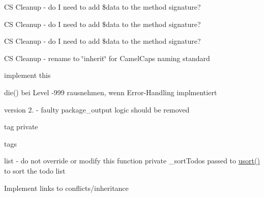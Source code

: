 
\begin{DoxyRefList}
\item[\label{todo__todo000087}%
\hypertarget{todo__todo000087}{}%
\-Global \hyperlink{_errors_8inc_a3a280f3829918777acb4ade45dc30f0c}{add\-Error} (\$num)]\-C\-S \-Cleanup -\/ do \-I need to add \$data to the method signature?  
\item[\label{todo__todo000088}%
\hypertarget{todo__todo000088}{}%
\-Global \hyperlink{_errors_8inc_a1fa964afb17dbe762076f1c70e13c1fb}{add\-Error\-Die} (\$num)]\-C\-S \-Cleanup -\/ do \-I need to add \$data to the method signature?  
\item[\label{todo__todo000089}%
\hypertarget{todo__todo000089}{}%
\-Global \hyperlink{_errors_8inc_a0ed443a8eae207cb1cc1df9a377e4ab8}{add\-Warning} (\$num)]\-C\-S \-Cleanup -\/ do \-I need to add \$data to the method signature?  
\item[\label{todo__todo000006}%
\hypertarget{todo__todo000006}{}%
\-Global \hyperlink{class_classes_ac40576cb234b55a55191a4fa3b9ed9da}{\-Classes} (\&\$render)]\-C\-S \-Cleanup -\/ rename to \char`\"{}inherit\char`\"{} for \-Camel\-Caps naming standard  
\item[\label{todo__todo000002}%
\hypertarget{todo__todo000002}{}%
\-Global \hyperlink{class_club_base_a569202f016e5285687d3be68677c24fd}{\-Club\-Base} (\$message= 'unknown error', \$code=\-P\-H\-P\-D\-O\-C\-U\-M\-E\-N\-T\-O\-R\-\_\-\-D\-E\-B\-U\-G\-\_\-\-E\-R\-R\-O\-R, \$mode=null, \$options=null, \$userinfo=null, \$error\-\_\-class=null)]implement this 
\item[\label{todo__todo000001}%
\hypertarget{todo__todo000001}{}%
\-Global \hyperlink{class_club_base_a6e3dfe5812adeeafd256d9001d418a00}{\-Club\-Base} (\$message, \$level=\-P\-H\-P\-D\-O\-C\-U\-M\-E\-N\-T\-O\-R\-\_\-\-D\-E\-B\-U\-G\-\_\-\-I\-N\-F\-O)]die() bei \-Level -\/999 rausnehmen, wenn \-Error-\/\-Handling implmentiert 
\item[\label{todo__todo000013}%
\hypertarget{todo__todo000013}{}%
\-Global \hyperlink{class_converter_a8b2134f03d563c80a3fd65a93e6a24eb}{\-Converter} (\&\$pages)]version 2. -\/ faulty package\-\_\-output logic should be removed 
\item[\label{todo__todo000016}%
\hypertarget{todo__todo000016}{}%
\-Global \hyperlink{class_converter_a3a06e4a7329f68ebc1d29b98550be50f}{\-Converter} (\$link, \$todos)]tag  private  
\item[\label{todo__todo000014}%
\hypertarget{todo__todo000014}{}%
\-Global \hyperlink{class_converter_a756b83c7febf175624cf1d2562bf02ae}{\-Converter} ()]tags   
\item[\label{todo__todo000015}%
\hypertarget{todo__todo000015}{}%
\-Global \hyperlink{class_converter_a2560c18a2f5984767ecd4cd766ca20af}{\-Converter} ()]list -\/ do not override or modify this function  private  \-\_\-sort\-Todos passed to \hyperlink{}{usort()} to sort the todo list  
\item[\label{todo__todo000017}%
\hypertarget{todo__todo000017}{}%
\-Namespace \hyperlink{namespace_converters}{\-Converters} ]\-Implement links to conflicts/inheritance 


\end{DoxyRefList}
